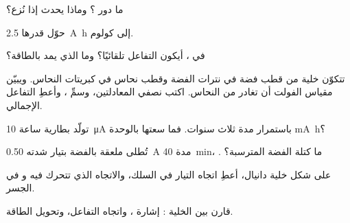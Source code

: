 \begin{exercise}[$\star$]\label{exo:g12:cells-and-electrolysis:3}
ما دور ؟ وماذا يحدث إذا نُزع؟
\end{exercise}

\begin{exercise}[$\star$]\label{exo:g12:cells-and-electrolysis:4}
حوّل  قدرها \qty{2.5}{A.h} إلى كولوم.
\end{exercise}

\begin{exercise}[$\star$]\label{exo:g12:cells-and-electrolysis:5}
في ، أيكون التفاعل تلقائيًا؟ وما الذي يمد
بالطاقة؟
\end{exercise}

\begin{exercise}[$\star\star$]\label{exo:g12:cells-and-electrolysis:6}
تتكوّن خلية من قطب فضة في نترات الفضة وقطب نحاس
في كبريتات النحاس. ويبيّن مقياس الفولت أن  تغادر
من النحاس. اكتب نصفي المعادلتين، وسمِّ  ،
وأعطِ التفاعل الإجمالي.
\end{exercise}

\begin{exercise}[$\star\star$]\label{exo:g12:cells-and-electrolysis:7}
تولّد بطارية ساعة \qty{10}{\micro A} باستمرار مدة ثلاث سنوات.
فما سعتها بالوحدة \si{mA.h}؟
\end{exercise}

\begin{exercise}[$\star\star$]\label{exo:g12:cells-and-electrolysis:8}
تُطلى ملعقة بالفضة بتيار شدته \qty{0.50}{A} مدة
\qty{40}{min}، . ما كتلة الفضة المترسبة؟
\end{exercise}

\begin{exercise}[$\star\star$]\label{exo:g12:cells-and-electrolysis:9}
على شكل خلية دانيال، أعطِ اتجاه التيار في
السلك، والاتجاه الذي تتحرك فيه   و في
الجسر.
\end{exercise}

\begin{exercise}[$\star\star$]\label{exo:g12:cells-and-electrolysis:10}
قارن بين الخلية : إشارة ، واتجاه
التفاعل، وتحويل الطاقة.
\end{exercise}

